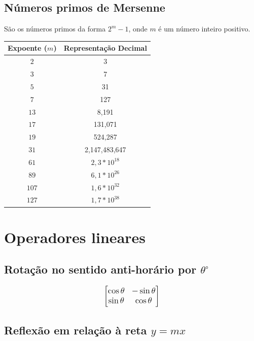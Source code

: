 \subsection{Números primos de Mersenne}

São os números primos da forma $2^m - 1$, onde $m$ é um número inteiro positivo.

\begin{table}[h]
  \centering
  \begin{tabular}{|c|c|}
    \hline
    \textbf{Expoente ($m$)} & \textbf{Representação Decimal} \\
    \hline
    \(2\) & 3 \\
    \hline
    \(3\) & 7 \\
    \hline
    \(5\) & 31 \\
    \hline
    \(7\) & 127 \\
    \hline
    \(13\) & 8,191 \\
    \hline
    \(17\) & 131,071 \\
    \hline
    \(19\) & 524,287 \\
    \hline
    \(31\) & 2,147,483,647 \\
    \hline
    \(61\) & $2,3 * 10^{18}$ \\
    \hline
    \(89\) & $6,1 * 10^{26}$ \\
    \hline
    \(107\) & $1,6 * 10^{32}$ \\
    \hline
    \(127\) & $1,7 * 10^{38}$ \\
    \hline
  \end{tabular}
\end{table}


\section{Operadores lineares}


\subsection{Rotação no sentido anti-horário por $\theta ^\circ$}

\begin{equation*} 
\large
\begin{bmatrix}
    \cos \theta & -\sin \theta \\
    \sin \theta & \cos \theta
\end{bmatrix}
\end{equation*}


\subsection{Reflexão em relação à reta $y = mx$ }


